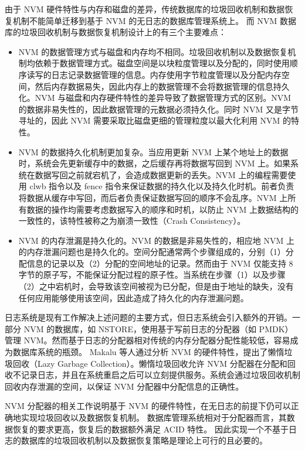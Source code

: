 由于 NVM 硬件特性与内存和磁盘的差异，传统数据库的垃圾回收机制和数据恢复机制不能简单迁移到基于 NVM 的无日志的数据库管理系统上。
而 NVM 数据库的垃圾回收机制与数据恢复机制设计上的有三个主要难点：
\begin{itemize}
    \item NVM 的数据管理方式与磁盘和内存均不相同。垃圾回收机制以及数据恢复机制均依赖于数据管理方式。磁盘空间是以块粒度管理以及分配的，同时使用顺序读写的日志记录数据管理的信息。内存使用字节粒度管理以及分配内存空间，然后内存数据易失，因此内存上的数据管理不会将数据管理的信息持久化。NVM 与磁盘和内存硬件特性的差异导致了数据管理方式的区别。NVM 的数据非易失性的，因此数据管理的元数据必须持久化。同时 NVM 又是字节寻址的，因此 NVM 需要采取比磁盘更细的管理粒度以最大化利用 NVM 的特性。
    \item NVM 的数据持久化机制更加复杂。当应用更新 NVM 上某个地址上的数据时，系统会先更新缓存中的数据，之后缓存再将数据写回到 NVM 上。如果系统在数据写回之前就宕机了，会造成数据更新的丢失。NVM 上的编程需要使用 clwb 指令以及 fence 指令来保证数据的持久化以及持久化时机。前者负责将数据从缓存中写回，而后者负责保证数据写回的顺序不会乱序。NVM 上所有数据的操作均需要考虑数据写入的顺序和时机，以防止 NVM 上数据结构的一致性的，该特性被称之为崩溃一致性（Crash Consistency）。
    \item NVM 的内存泄漏是持久化的。NVM 的数据是非易失性的，相应地 NVM 上的内存泄漏问题也是持久化的。空间分配通常两个步骤组成的，分别（1）分配信息的记录以及（2）分配的空间地址的记录。然而由于 NVM 仅能支持 8 字节的原子写，不能保证分配过程的原子性。当系统在步骤（1）以及步骤（2）之中宕机时，会导致该空间被视为已分配，但是由于地址的缺失，没有任何应用能够使用该空间，因此造成了持久化的内存泄漏问题。

\end{itemize}

日志系统是现有工作解决上述问题的主要方式，但日志系统会引入额外的开销。一部分 NVM 的数据库，如 NSTORE，使用基于写前日志的分配器（如 PMDK\cite{pmdk}）管理 NVM。然而基于日志的分配器相对传统的内存分配器分配性能较低，容易成为数据库系统的瓶颈。
Makalu 等人通过分析 NVM 的硬件特性，提出了懒惰垃圾回收（Lazy Garbage Collection）\cite{bhandari_makalu_2016}。懒惰垃圾回收允许 NVM 分配器在分配和回收不记录日志，并且在系统重启之后可以立刻提供服务。系统会通过垃圾回收机制回收内存泄漏的空间，以保证 NVM 分配器中分配信息的正确性。

NVM 分配器的相关工作说明基于 NVM 的硬件特性，在无日志的前提下仍可以正确地实现垃圾回收以及数据恢复机制。
数据库管理系统相对于分配器而言，其数据恢复的要求更高，恢复后的数据额外满足 ACID 特性。
因此实现一个不基于日志的数据库的垃圾回收机制以及数据恢复策略是理论上可行的且必要的。

